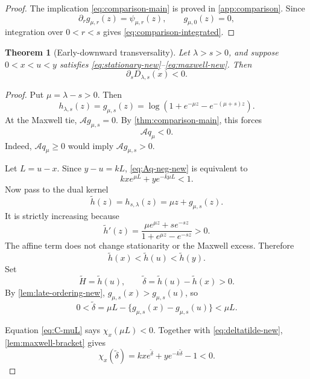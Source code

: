 \documentclass[11pt]{article}
\theoremstyle{plain}
\newtheorem{theorem}{Theorem}[section]
\theoremstyle{definition}
\theoremstyle{remark}
\newcommand{\cA}{\mathcal A}
\begin{document}
\begin{proof}
The implication \eqref{eq:comparison-main} is proved in \cref{app:comparison}.  Since
\[
\partial_r g_{\mu,r}(z)=\psi_{\mu,r}(z),
\qquad g_{\mu,0}(z)=0,
\]
integration over \(0<r<s\) gives \eqref{eq:comparison-integrated}.
\end{proof}

\begin{theorem}[Early-downward transversality]\label{thm:early-down-new}
Let \(\lambda>s>0\), and suppose \(0<x<u<y\) satisfies \eqref{eq:stationary-new}--\eqref{eq:maxwell-new}.  Then
\begin{equation}\label{eq:Ds-neg-new}
\partial_sD_{\lambda,s}(x)<0.
\end{equation}
\end{theorem}

\begin{proof}
Put \(\mu=\lambda-s>0\).  Then
\[
h_{\lambda,s}(z)=g_{\mu,s}(z)
=\log\left(1+e^{-\mu z}-e^{-(\mu+s)z}\right).
\]
At the Maxwell tie, \(\cA g_{\mu,s}=0\).  By \cref{thm:comparison-main}, this forces
\begin{equation}\label{eq:Aq-neg-new}
\cA q_\mu<0.
\end{equation}
Indeed, \(\cA q_\mu\ge0\) would imply \(\cA g_{\mu,s}>0\).

Let \(L=u-x\).  Since \(y-u=kL\), \eqref{eq:Aq-neg-new} is equivalent to
\begin{equation}\label{eq:C-muL}
kx e^{\mu L}+y e^{-k\mu L}<1.
\end{equation}
Now pass to the dual kernel
\[
\widetilde h(z)=h_{s,\lambda}(z)=\mu z+g_{\mu,s}(z).
\]
It is strictly increasing because
\[
\widetilde h'(z)
=\frac{\mu e^{\mu z}+s e^{-sz}}
{1+e^{\mu z}-e^{-sz}}>0.
\]
The affine term does not change stationarity or the Maxwell excess.  Therefore
\[
\widetilde h(x)<\widetilde h(u)<\widetilde h(y).
\]
Set
\[
\widetilde H=\widetilde h(u),
\qquad
\widetilde\delta=\widetilde h(u)-\widetilde h(x)>0.
\]
By \cref{lem:late-ordering-new}, \(g_{\mu,s}(x)>g_{\mu,s}(u)\), so
\begin{equation}\label{eq:deltatilde-new}
0<\widetilde\delta
=\mu L-\{g_{\mu,s}(x)-g_{\mu,s}(u)\}
<\mu L.
\end{equation}

Equation \eqref{eq:C-muL} says \(\chi_x(\mu L)<0\).  Together with \eqref{eq:deltatilde-new}, \cref{lem:maxwell-bracket} gives
\begin{equation}\label{eq:early-bracket-new}
\chi_x(\widetilde\delta)
=kx e^{\widetilde\delta}+y e^{-k\widetilde\delta}-1<0.
\end{equation}


\end{proof}
\end{document}
